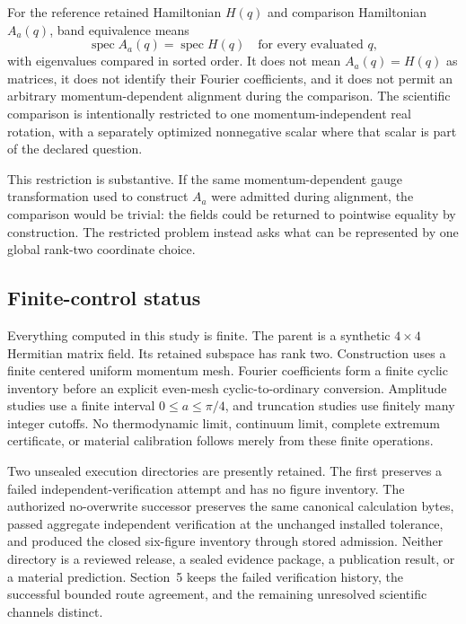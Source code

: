 For the reference retained Hamiltonian $H(q)$ and comparison Hamiltonian $A_a(q)$,
band equivalence means
\begin{equation}
 \operatorname{spec} A_a(q)=\operatorname{spec} H(q)
 \quad\text{for every evaluated }q,
 \label{eq:band-equivalence-definition}
\end{equation}
with eigenvalues compared in sorted order.  It does not mean $A_a(q)=H(q)$ as matrices,
it does not identify their Fourier coefficients, and it does not permit an arbitrary
momentum-dependent alignment during the comparison.  The scientific comparison is
intentionally restricted to one momentum-independent real rotation, with a separately
optimized nonnegative scalar where that scalar is part of the declared question.

This restriction is substantive.  If the same momentum-dependent gauge transformation
used to construct $A_a$ were admitted during alignment, the comparison would be
trivial: the fields could be returned to pointwise equality by construction.  The
restricted problem instead asks what can be represented by one global rank-two
coordinate choice.

\subsection{Finite-control status}

Everything computed in this study is finite.  The parent is a synthetic $4\times4$
Hermitian matrix field.  Its retained subspace has rank two.  Construction uses a finite
centered uniform momentum mesh.  Fourier coefficients form a finite cyclic inventory
before an explicit even-mesh cyclic-to-ordinary conversion.  Amplitude studies use a
finite interval $0\le a\le\pi/4$, and truncation studies use finitely many integer
cutoffs.  No thermodynamic limit, continuum limit, complete extremum certificate, or
material calibration follows merely from these finite operations.

Two unsealed execution directories are presently retained.  The first preserves a
failed independent-verification attempt and has no figure inventory.  The authorized
no-overwrite successor preserves the same canonical calculation bytes, passed aggregate
independent verification at the unchanged installed tolerance, and produced the closed
six-figure inventory through stored admission.  Neither directory is a reviewed release,
a sealed evidence package, a publication result, or a material prediction.  Section~5
keeps the failed verification history, the successful bounded route agreement, and the
remaining unresolved scientific channels distinct.

